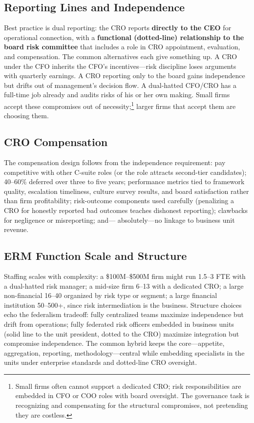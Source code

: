\documentclass[11pt,openany]{book}
\begin{document}
\subsection{Reporting Lines and Independence}
\label{subsec:cro-reporting}

Best practice is dual reporting: the CRO reports \textbf{directly to the CEO}
for operational connection, with a \textbf{functional (dotted-line)
relationship to the board risk committee} that includes a role in CRO
appointment, evaluation, and compensation. The common alternatives each give
something up. A CRO under the CFO inherits the CFO's incentives---risk
discipline loses arguments with quarterly earnings. A CRO reporting only to
the board gains independence but drifts out of management's decision flow. A
dual-hatted CFO/CRO has a full-time job already and audits risks of his or
her own making. Small firms accept these compromises out of
necessity;\footnote{Small firms often cannot support a dedicated CRO; risk
responsibilities are embedded in CFO or COO roles with board oversight. The
governance task is recognizing and compensating for the structural
compromises, not pretending they are costless.} larger firms that accept them
are choosing them.

\subsection{CRO Compensation}

The compensation design follows from the independence requirement: pay
competitive with other C-suite roles (or the role attracts second-tier
candidates); 40--60\% deferred over three to five years; performance metrics
tied to framework quality, escalation timeliness, culture survey results, and
board satisfaction rather than firm profitability; risk-outcome components
used carefully (penalizing a CRO for honestly reported bad outcomes teaches
dishonest reporting); clawbacks for negligence or misreporting; and---%
absolutely---no linkage to business unit revenue.

\subsection{ERM Function Scale and Structure}

Staffing scales with complexity: a \$100M--\$500M firm might run 1.5--3 FTE
with a dual-hatted risk manager; a mid-size firm 6--13 with a dedicated CRO;
a large non-financial 16--40 organized by risk type or segment; a large
financial institution 50--500+, since risk intermediation is the business.
Structure choices echo the federalism tradeoff: fully centralized teams
maximize independence but drift from operations; fully federated risk
officers embedded in business units (solid line to the unit president, dotted
to the CRO) maximize integration but compromise independence. The common
hybrid keeps the core---appetite, aggregation, reporting,
methodology---central while embedding specialists in the units under
enterprise standards and dotted-line CRO oversight.
\end{document}
